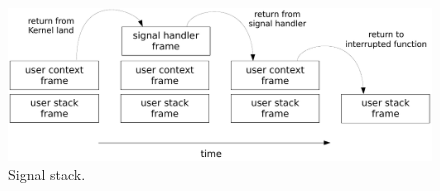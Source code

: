 	\begin{figure}[b]
		\centering
		\includegraphics[scale=0.55]{img/signal-stack}
		\caption{Signal stack.}
		\label{figure: signal stack}
	\end{figure}

